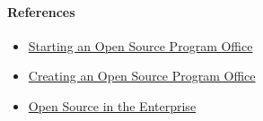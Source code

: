 \hypertarget{references}{%
\paragraph{References}\label{references}}

\begin{itemize}
\tightlist
\item
  \href{https://www.slideshare.net/caniszczyk/starting-an-open-source-program-office-ospo}{Starting
  an Open Source Program Office}
\item
  \href{https://events19.linuxfoundation.org/wp-content/uploads/2018/07/OSLS_2019-untold-story-of-OSPO.pdf}{Creating
  an Open Source Program Office}
\item
  \href{https://d1.awsstatic.com/Open\%20Source/enterprise-oss-book.pdf}{Open
  Source in the Enterprise}
\end{itemize}

